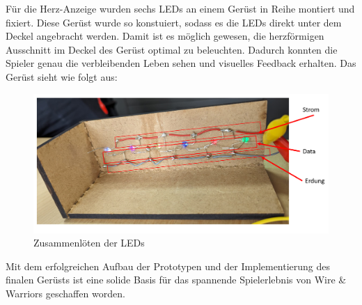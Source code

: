 Für die Herz-Anzeige wurden sechs LEDs an einem Gerüst in Reihe montiert und fixiert. Diese Gerüst wurde so konstuiert, sodass es die LEDs direkt unter dem Deckel angebracht werden. Damit ist es möglich gewesen, die herzförmigen Ausschnitt im Deckel des Gerüst optimal zu beleuchten. Dadurch konnten die Spieler genau die verbleibenden Leben sehen und visuelles Feedback erhalten. Das Gerüst sieht wie folgt aus:

\begin{figure}[H]
 \centerline{\includegraphics[width=.85\textwidth,scale=1]{./images/herzen_leds.png}}
 \caption{Zusammenlöten der LEDs}\label{herzen}
\end{figure} 

Mit dem erfolgreichen Aufbau der Prototypen und der Implementierung des finalen Gerüsts ist eine solide Basis für das spannende Spielerlebnis von Wire \& Warriors geschaffen worden.